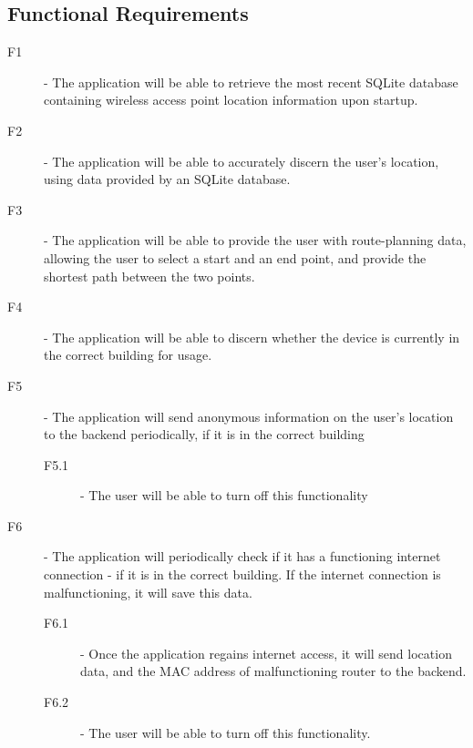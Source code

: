 \documentclass[11pt]{informatics-report}
\begin{document}
\subsection{Functional Requirements}
\begin{description}
\item[F1] - The application will be able to retrieve the most recent SQLite database containing wireless access point location information upon startup.
\item[F2] - The application will be able to accurately discern the user's location, using data provided by an SQLite database.
\item[F3] - The application will be able to provide the user with route-planning data, allowing the user to select a start and an end point, and provide the shortest path between the two points.
\item[F4] - The application will be able to discern whether the device is currently in the correct building for usage.
\item[F5] - The application will send anonymous information on the user's location to the backend periodically, if it is in the correct building
	\begin{description}
	\item[F5.1] - The user will be able to turn off this functionality
	\end{description}
\item[F6] - The application will periodically check if it has a functioning internet connection - if it is in the correct building. If the internet connection is malfunctioning, it will save this data.
	\begin{description}
	\item[F6.1] - Once the application regains internet access, it will send location data, and the MAC address of malfunctioning router to the backend.
	\item[F6.2] - The user will be able to turn off this functionality.
	\end{description}
\end{description}
\end{document}
